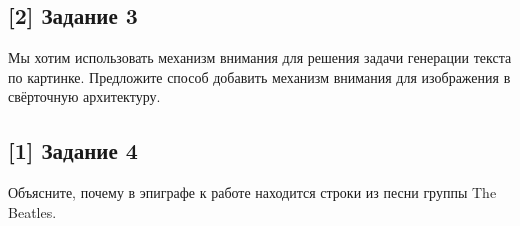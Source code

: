 \documentclass[12pt, a4paper, oneside]{article}
\begin{document}
\subsection*{[2] Задание 3}
\vspace{-0.5cm}

Мы хотим использовать механизм внимания для решения задачи генерации текста по картинке. Предложите способ добавить механизм внимания для изображения в свёрточную архитектуру. 

\vspace{-0.5cm}
\subsection*{[1] Задание 4}
\vspace{-0.5cm}
Объясните, почему в эпиграфе к работе находится строки из песни группы The Beatles. 
\end{document}
